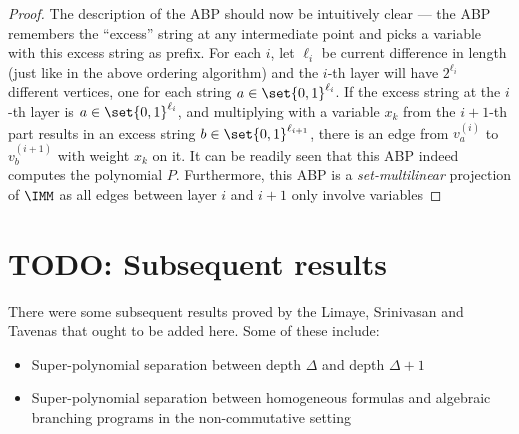 \begin{proof}
The description of the ABP should now be intuitively clear --- the ABP remembers the ``excess'' string at any intermediate point and picks a variable with this excess string as prefix. For each $i$, let $\ell_i$ be current difference in length (just like in the above ordering algorithm) and the $i$-th layer will have $2^{\ell_i}$ different vertices, one for each string $a \in \set{0,1}^{\ell_i}$. If the excess string at the $i$-th layer is $a \in \set{0,1}^{\ell_i}$, and multiplying with a variable $x_{k}$ from the $i+1$-th part results in an excess string $b \in \set{0,1}^{\ell_{i+1}}$, there is an edge from $v_{a}^{(i)}$ to $v_{b}^{(i+1)}$ with weight $x_k$ on it. It can be readily seen that this ABP indeed computes the polynomial $P$. Furthermore, this ABP is a \emph{set-multilinear} projection of $\IMM$ as all edges between layer $i$ and $i+1$ only involve variables   
\end{proof}

  

\section{TODO: Subsequent results}

There were some subsequent results proved by the Limaye, Srinivasan and Tavenas that ought to be added here. Some of these include:
\begin{itemize}\itemsep0pt
\item Super-polynomial separation between depth $\Delta$ and depth $\Delta+1$
\item Super-polynomial separation between homogeneous formulas and algebraic branching programs in the non-commutative setting
\end{itemize}





